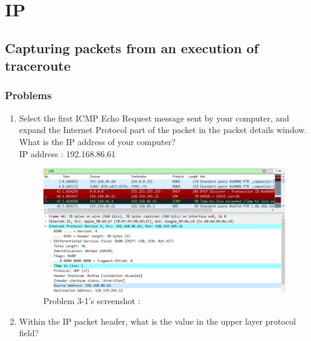 \section{IP}
\subsection{Capturing packets from an execution of traceroute}
    \subsubsection*{Problems}
    \begin{enumerate}[label=\bfseries Problem \arabic*:,leftmargin=*,labelindent=1em]
        \item Select the first ICMP Echo Request message sent by your computer, 
        and expand the Internet Protocol part of the packet in the packet details window.
        What is the IP address of your computer?\\[0.2mm]
        \soln IP address : 192.168.86.61
        \begin{figure}[!h]\centering
        \hspace{15mm}  
    		\includegraphics[width=.85\textwidth]{image/week02/3-1-1.png}
    		\caption{\footnotesize Problem 3-1's screenshot : }
    		\vspace{-10pt}
        \end{figure}
        \item Within the IP packet header, what is the value in the upper layer protocol field?\\[0.2mm]
        \soln
        \begin{figure}[!h]\centering
        \hspace{15mm}  

\end{figure}
\end{enumerate}
